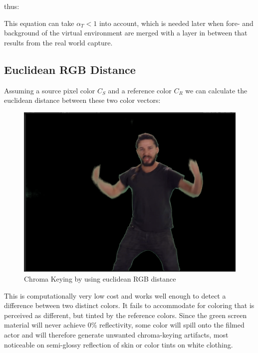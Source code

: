thus:


This equation can take $\alpha_T < 1$ into account, which is needed later when 
fore- and background of the virtual environment are merged with a layer in 
between that results from the real world capture.

\subsection{Euclidean RGB Distance}
Assuming a source pixel color $C_S$ and a reference color $C_R$ we can 
calculate the euclidean distance between these two color vectors:

\begin{figure}[htb]
	\includegraphics[width=\textwidth]{gfx/distances/chroma-rgb.png}
	\caption{Chroma Keying by using euclidean RGB distance}
	\label{fig:chroma:euclidean:rgb}
\end{figure}

This is computationally very low cost and works well enough to detect a 
difference between two distinct colors. It fails to accommodate for coloring 
that is perceived as different, but tinted by the reference colors. Since the 
green screen material will never achieve 0\% reflectivity, some color will 
spill onto the filmed actor and will therefore generate unwanted chroma-keying 
artifacts, most noticeable on semi-glossy reflection of skin or color tints on 
white clothing.

